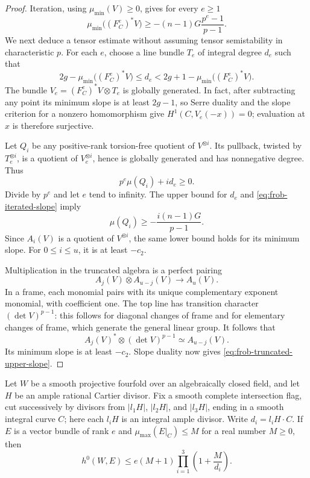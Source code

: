 \begin{proof}
Iteration, using $\mu_{\min}(V)\ge0$, gives for every $e\ge1$
\begin{equation}\label{eq:frob-iterated-slope}
 \mu_{\min}\bigl((F_C^e)^*V\bigr)
 \ge -(n-1)G\frac{p^e-1}{p-1}.
\end{equation}
We next deduce a tensor estimate without assuming tensor semistability in
characteristic $p$.  For each $e$, choose a line bundle $T_e$ of integral
degree $d_e$ such that
\[
 2g-\mu_{\min}\bigl((F_C^e)^*V\bigr)
 \le d_e<
 2g+1-\mu_{\min}\bigl((F_C^e)^*V\bigr).
\]
The bundle $V_e=(F_C^e)^*V\otimes T_e$ is globally generated.  In fact,
after subtracting any point its minimum slope is at least $2g-1$, so
Serre duality and the slope criterion for a nonzero homomorphism give
$H^1(C,V_e(-x))=0$; evaluation at $x$ is therefore surjective.

Let $Q_i$ be any positive-rank torsion-free quotient of $V^{\otimes i}$.
Its pullback, twisted by $T_e^{\otimes i}$, is a quotient of
$V_e^{\otimes i}$, hence is globally generated and has nonnegative
degree.  Thus
\[
 p^e\mu(Q_i)+i d_e\ge0.
\]
Divide by $p^e$ and let $e$ tend to infinity.  The upper bound for $d_e$
and \eqref{eq:frob-iterated-slope} imply
\begin{equation}\label{eq:frob-tensor-minimum}
 \mu(Q_i)\ge-\frac{i(n-1)G}{p-1}.
\end{equation}
Since $A_i(V)$ is a quotient of $V^{\otimes i}$, the same lower bound
holds for its minimum slope.  For $0\le i\le u$, it is at least $-c_2$.

Multiplication in the truncated algebra is a perfect pairing
\[
 A_j(V)\otimes A_{u-j}(V)\longrightarrow A_u(V).
\]
In a frame, each monomial pairs with its unique complementary exponent
monomial, with coefficient one.  The top line has transition character
$(\det V)^{p-1}$: this follows for diagonal changes of frame and for
elementary changes of frame, which generate the general linear group.
It follows that
\[
 A_j(V)^*\otimes(\det V)^{p-1}\simeq A_{u-j}(V).
\]
Its minimum slope is at least $-c_2$.  Slope duality now gives
\eqref{eq:frob-truncated-upper-slope}.
\end{proof}

\begin{lemma}\label{lem:frob-flag-sections}
Let $W$ be a smooth projective fourfold over an algebraically closed
field, and let $H$ be an ample rational Cartier divisor.  Fix a smooth
complete intersection flag, cut successively by divisors from
$|l_1H|$, $|l_2H|$, and $|l_3H|$, ending in a smooth integral curve $C$;
here each $l_iH$ is an integral ample divisor.  Write
$d_i=l_iH\cdot C$.  If $E$ is a vector bundle of rank $e$ and
$\mu_{\max}(E|_C)\le M$ for a real number $M\ge0$, then
\begin{equation}\label{eq:frob-flag-sections}
 h^0(W,E)\le e(M+1)\prod_{i=1}^3\left(1+\frac{M}{d_i}\right).
\end{equation}
\end{lemma}

